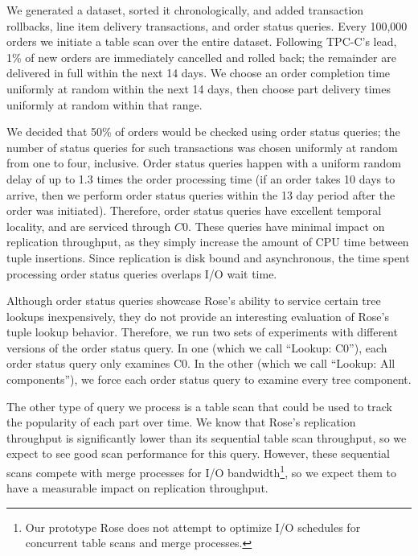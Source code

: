 \documentclass{vldb}
\newcommand{\rows}{Rose\xspace}
\newcommand{\rowss}{Rose's\xspace}
\begin{document}
We generated a dataset, sorted it chronologically, and
added transaction rollbacks, line item delivery transactions, and
order status queries.  Every 100,000 orders we initiate a table scan
over the entire dataset.  Following TPC-C's lead, 1\% of new orders are immediately cancelled
and rolled back; the remainder are delivered in full within the
next 14 days.  We choose an order completion time uniformly at
random within the next 14 days, then choose part delivery times
uniformly at random within that range.

We decided that 50\% of orders would be checked
using order status queries; the number of status queries for such
transactions was chosen uniformly at random from one to four, inclusive.
Order status queries happen with a uniform random delay of up to 1.3 times
the order processing time (if an order takes 10 days
to arrive, then we perform order status queries within the 13 day
period after the order was initiated).  Therefore, order status
queries have excellent temporal locality, and are serviced
through $C0$.   These queries have minimal impact on replication
throughput, as they simply increase the amount of CPU time between
tuple insertions.  Since replication is disk bound and asynchronous, the time spent
processing order status queries overlaps I/O wait time.

Although order status queries showcase \rowss ability to service
certain tree lookups inexpensively, they do not provide an interesting
evaluation of \rowss tuple lookup behavior.  Therefore, we run two sets
of experiments with different versions of the order status query.  In
one (which we call ``Lookup: C0''), each order status query only examines C0.
In the other (which we call ``Lookup: All components''), we force each order status query
to examine every tree component.

The other type of query we process is a table scan that could be used
to track the popularity of each part over time.  We know that \rowss
replication throughput is significantly lower than its sequential
table scan throughput, so we expect to see good scan performance for
this query.  However, these sequential scans compete with merge
processes for I/O bandwidth\footnote{Our prototype \rows does not
  attempt to optimize I/O schedules for concurrent table scans and
  merge processes.}, so we expect them to have a measurable impact on
replication throughput.
\end{document}

